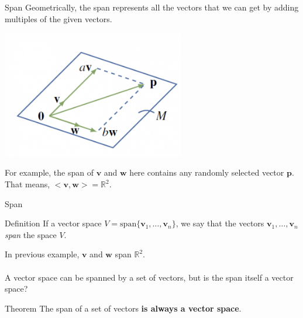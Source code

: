 \documentclass{beamer}
\newcommand{\vv}{\mathbf{v}}
\newcommand{\vw}{\mathbf{w}}
\newcommand{\R}{\mathbb{R}}
\begin{document}
\begin{frame}{Span}
Geometrically, the span represents all the vectors that we can get by adding multiples of the given vectors.\pause  
      \begin{center}
    \includegraphics[width=0.6\textwidth, height=\textheight, keepaspectratio]{span.png}
  \end{center}

  For example, the span of $\vv$ and $\vw$ here contains any randomly selected vector $\mathbf{p}$. That means, $<\vv,\vw>=$\pause$\R^2$.

\end{frame}


\begin{frame}{Span}


 \begin{block}{Definition}
    If a vector space $V = \text{span}\{\vv_{1}, \dots, \vv_{n}\}$, we say that the vectors $\vv_{1}, \dots, \vv_{n}$ \textit{span} the space $V$.
  \end{block}

\pause In previous example, $\vv$ and $\vw$ span $\R^2$.
\pause \\ \\ \medskip A vector space can be spanned by a set of vectors, but is the span itself a vector space? \pause
  
 \begin{block}{Theorem}
     The span of a set of vectors \textbf{is always a vector space}.
 \end{block}

 
\end{frame}
\end{document}
